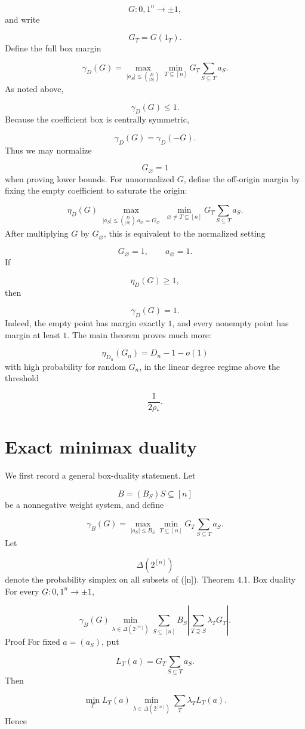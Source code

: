 \documentclass[11pt]{article}
\theoremstyle{definition}
\begin{document}
\[
G:{0,1}^n\to{\pm1},
\]
and write

\[
G_T=G(1_T).
\]
Define the full box margin

\[
\gamma_D(G)=
\max_{|a_S|\le \binom{D}{|S|}}
\min_{T\subseteq[n]}
G_T\sum_{S\subseteq T}a_S.
\]
As noted above,

\[
\gamma_D(G)\le1.
\]
Because the coefficient box is centrally symmetric,

\[
\gamma_D(G)=\gamma_D(-G).
\]
Thus we may normalize

\[
G_\varnothing=1
\]
when proving lower bounds. For unnormalized $G$, define the off-origin margin by fixing the empty coefficient to saturate the origin:

\[
\eta_D(G)
\max_{\substack{|a_S|\le \binom{D}{|S|}\ a_\varnothing=G_\varnothing}}
\min_{\varnothing\ne T\subseteq[n]}
G_T\sum_{S\subseteq T}a_S.
\]
After multiplying $G$ by $G_\varnothing$, this is equivalent to the normalized setting

\[
G_\varnothing=1,
\qquad
a_\varnothing=1.
\]
If

\[
\eta_D(G)\ge1,
\]
then

\[
\gamma_D(G)=1.
\]
Indeed, the empty point has margin exactly $1$, and every nonempty point has margin at least $1$. The main theorem proves much more:

\[
\eta_{D_n}(G_n)=D_n-1-o(1)
\]
with high probability for random $G_n$, in the linear degree regime above the threshold

\[
\frac1{2\rho_*}.
\]
\section{Exact minimax duality}
We first record a general box-duality statement. Let

\[
B=(B_S){S\subseteq[n]}
\]
be a nonnegative weight system, and define

\[
\gamma_B(G)=
\max_{|a_S|\le B_S}
\min_{T\subseteq[n]}
G_T\sum_{S\subseteq T}a_S.
\]
Let

\[
\Delta(2^{[n]})
\]
denote the probability simplex on all subsets of ([n]). Theorem 4.1. Box duality For every $G:{0,1}^n\to{\pm1}$,

\[
\gamma_B(G)
\min_{\lambda\in\Delta(2^{[n]})}
\sum_{S\subseteq[n]}B_S
\left|
\sum_{T\supseteq S}\lambda_TG_T
\right|.
\]
Proof For fixed $a=(a_S)$, put

\[
L_T(a)=G_T\sum_{S\subseteq T}a_S.
\]
Then

\[
\min_TL_T(a)
\min_{\lambda\in\Delta(2^{[n]})}
\sum_T\lambda_TL_T(a).
\]
Hence
\end{document}
